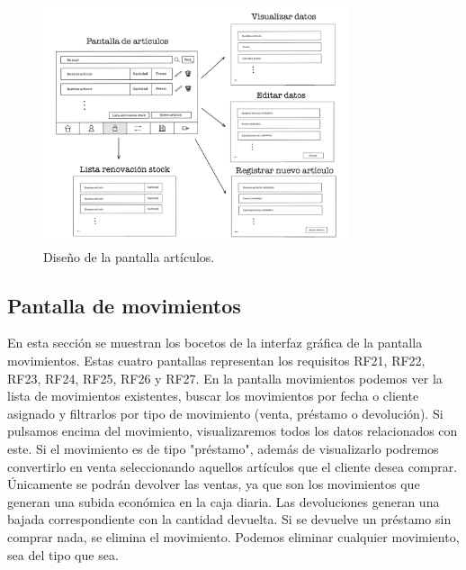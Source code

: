 \begin{figure}[ht]
	\centering
	\includegraphics[width=0.8\textwidth, angle=270]{imagenes/pantalla_articulos.JPG}
	\caption{Diseño de la pantalla artículos.}
	\label{fig:pantallaarticulos}
\end{figure}

\newpage


\subsection{Pantalla de movimientos}

En esta sección se muestran los bocetos de la interfaz gráfica de la pantalla movimientos. Estas cuatro pantallas representan los requisitos RF21, RF22, RF23, RF24, RF25, RF26 y RF27. En la pantalla movimientos podemos ver la lista de movimientos existentes, buscar los movimientos por fecha o cliente asignado y filtrarlos por tipo de movimiento (venta, préstamo o devolución). Si pulsamos encima del movimiento, visualizaremos todos los datos relacionados con este. Si el movimiento es de tipo "préstamo", además de visualizarlo podremos convertirlo en venta seleccionando aquellos artículos que el cliente desea comprar. Únicamente se podrán devolver las ventas, ya que son los movimientos que generan una subida económica en la caja diaria. Las devoluciones generan una bajada correspondiente con la cantidad devuelta. Si se devuelve un préstamo sin comprar nada, se elimina el movimiento. Podemos eliminar cualquier movimiento, sea del tipo que sea. 


